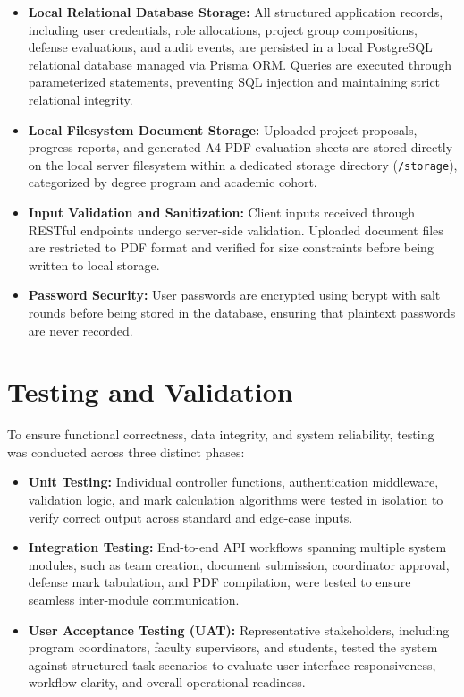 \begin{itemize}
  \item \textbf{Local Relational Database Storage:} All structured application records, including user credentials, role allocations, project group compositions, defense evaluations, and audit events, are persisted in a local PostgreSQL relational database managed via Prisma ORM. Queries are executed through parameterized statements, preventing SQL injection and maintaining strict relational integrity.
  
  \item \textbf{Local Filesystem Document Storage:} Uploaded project proposals, progress reports, and generated A4 PDF evaluation sheets are stored directly on the local server filesystem within a dedicated storage directory (\texttt{/storage}), categorized by degree program and academic cohort.
  
  \item \textbf{Input Validation and Sanitization:} Client inputs received through RESTful endpoints undergo server-side validation. Uploaded document files are restricted to PDF format and verified for size constraints before being written to local storage.
  
  \item \textbf{Password Security:} User passwords are encrypted using bcrypt with salt rounds before being stored in the database, ensuring that plaintext passwords are never recorded.
\end{itemize}

\section{Testing and Validation}
To ensure functional correctness, data integrity, and system reliability, testing was conducted across three distinct phases:

\begin{itemize}
  \item \textbf{Unit Testing:} Individual controller functions, authentication middleware, validation logic, and mark calculation algorithms were tested in isolation to verify correct output across standard and edge-case inputs.
  
  \item \textbf{Integration Testing:} End-to-end API workflows spanning multiple system modules, such as team creation, document submission, coordinator approval, defense mark tabulation, and PDF compilation, were tested to ensure seamless inter-module communication.
  
  \item \textbf{User Acceptance Testing (UAT):} Representative stakeholders, including program coordinators, faculty supervisors, and students, tested the system against structured task scenarios to evaluate user interface responsiveness, workflow clarity, and overall operational readiness.
\end{itemize}


